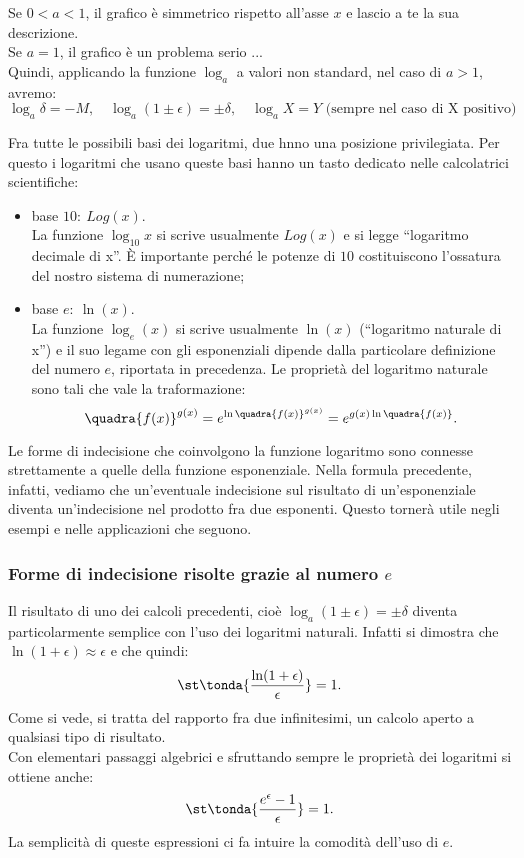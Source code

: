 Se $0<a<1$, il grafico è simmetrico rispetto all'asse $x$ e lascio a te la 
sua descrizione.\\
Se $a=1$, il grafico è un problema serio ...\\
Quindi, applicando la funzione $\log_a$ a valori non standard, nel caso di $a>1$, 
avremo: 
\[
 \log_a \delta=-M, \quad \log_a (1\pm\epsilon)=\pm\delta,\quad \log_a X=Y 
 \text{ (sempre nel caso di X positivo)}
\]

\begin{osservazione}
 Fra tutte le possibili basi dei logaritmi, due hnno una posizione privilegiata. 
 Per questo i logaritmi che usano queste basi hanno un tasto dedicato nelle calcolatrici
 scientifiche:
 \begin{itemize} [noitemsep]
 \item 
base $10:\ Log(x)$.\\
La funzione $\log_{10}{x}$ si scrive usualmente $Log(x)$ e si legge 
``logaritmo decimale di x''. È importante perché le potenze di $10$ costituiscono 
l'ossatura del nostro sistema di numerazione;
 \item
base $e:\ \ln(x)$.\\
La funzione $\log_e(x)$ si scrive usualmente $\ln(x)$ (``logaritmo naturale di x'')
e il suo legame con gli esponenziali dipende dalla particolare definizione
del numero $e$, riportata in precedenza. Le proprietà del logaritmo naturale sono
tali che vale la traformazione:
\[
 \quadra{f(x)}^{g(x)}=e^{\ln\quadra{f(x)}^{g(x)}}=e^{g(x)\ln\quadra{f(x)}}.
\]
 \end{itemize}
\end{osservazione}

\begin{osservazione}
Le forme di indecisione che coinvolgono la funzione logaritmo sono
connesse strettamente a quelle della funzione esponenziale. Nella formula 
precedente, infatti, vediamo che un'eventuale indecisione sul risultato di
un'esponenziale diventa un'indecisione nel prodotto fra due esponenti.
Questo tornerà utile negli esempi e nelle applicazioni che seguono.
\end{osservazione}

\subsubsection{Forme di indecisione risolte grazie al numero $e$}
\label{subsubsec:insnum_ind_e}
Il risultato di uno dei calcoli precedenti, cioè 
$\log_a (1\pm\epsilon)=\pm\delta$ diventa particolarmente semplice 
con l'uso dei logaritmi naturali. Infatti si dimostra
che $\ln(1+\epsilon)\approx\epsilon$ e che quindi:
\[
\st\tonda{\frac{\ln(1+\epsilon)}{\epsilon}}=1.
\]
Come si vede, si tratta del rapporto fra due infinitesimi, un
calcolo aperto a qualsiasi tipo di risultato.\\
Con elementari passaggi algebrici e sfruttando sempre le proprietà dei 
logaritmi si ottiene anche:
\[
\st\tonda{\frac{e^\epsilon-1}{\epsilon}}=1.
\]
La semplicità di queste espressioni ci fa intuire la comodità dell'uso di $e$.

